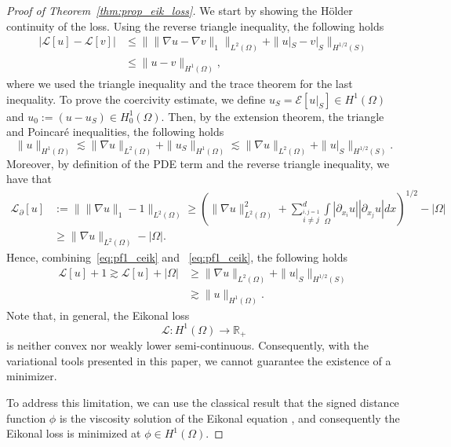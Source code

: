 \documentclass[pdflatex]{sn-jnl}%
\begin{document}
\vspace{-1em}\begin{proof}[Proof of Theorem~\ref{thm:prop_eik_loss}]\label{proof-thm_eik}
 We start by showing the H\"older continuity of the loss. Using the reverse triangle inequality, the following holds
\begin{align*}
    |\mathcal{L}[u]-\mathcal{L}[v]|&\leq \bigr\|\|\nabla u-\nabla v\|_1\bigr\|_{L^2(\Omega)} + \|u|_S-v|_S\|_{H^{1/2}(S)}\\&
    \leq \|u-v\|_{H^1(\Omega)},
\end{align*}
where we used the triangle inequality and the trace theorem for the last inequality. 
To prove the coercivity estimate, we define $u_S = \mathcal{E}[u|_{S}]\in H^1(\Omega)$ and $u_0:=(u-u_S)\in H^1_0(\Omega)$. Then, by the extension theorem, the triangle and Poincar\'e inequalities, the following holds
\begin{equation}\label{eq:pf1_ceik}
\|u\|_{H^1(\Omega)}\lesssim \|\nabla u\|_{L^2(\Omega)}+\|u_S\|_{H^1(\Omega)}\lesssim \|\nabla u\|_{L^2(\Omega)}+\|u|_S\|_{H^{1/2}(S)}.
\end{equation}
Moreover, by definition of the PDE term and the reverse triangle inequality, we have that 
\begin{align}\label{eq:pf2_ceik}
    \mathcal{L}_\partial[u] &:=  \bigr\|\|\nabla u\|_1-1\bigr\|_{L^2(\Omega)} \geq \left(\|\nabla u\|_{L^2(\Omega)}^2+\sum\limits_{\stackrel{i,j=1}{i\neq j}}^d\int\limits_\Omega |\partial_{x_i}u| |\partial_{x_j}u|dx\right)^{1/2}-|\Omega|\\&
    \geq \|\nabla u\|_{L^2(\Omega)}-|\Omega|.
\end{align}
Hence, combining~\eqref{eq:pf1_ceik} and ~\eqref{eq:pf1_ceik}, the following holds
\begin{align}
     \mathcal{L}[u]+1\gtrsim \mathcal{L}[u]+|\Omega| &\geq \|\nabla u \|_{L^2(\Omega)}+\|u|_S\|_{H^{1/2}(S)}\\&
    \gtrsim \|u\|_{H^1(\Omega)}.
\end{align}
 Note that, in general, the Eikonal loss 
\[
\mathcal{L}:H^{1}(\Omega)\rightarrow\mathbb{R}_{+}
\]
is neither convex nor weakly lower semi-continuous. Consequently, with the variational tools presented in this paper, we cannot guarantee the existence of a minimizer. 

To address this limitation, we can use the classical result that the signed distance function $\phi$ is the viscosity solution of the Eikonal equation \cite{Katzourakis2014-fe}, and consequently the Eikonal loss is minimized at $\phi\in H^1(\Omega)$. 


\end{proof}
\end{document}
